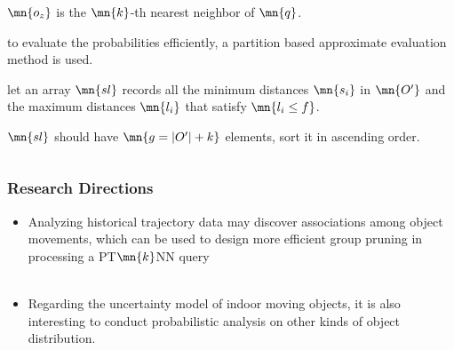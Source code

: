 \begin{frame}
\begin{columns}[c]
  \begin{sitemize}
    \item $\mn{o_z}$ is the $\mn{k}$-th nearest neighbor of $\mn{q}$.
    \item to evaluate the probabilities efficiently, a partition based approximate evaluation method is used.
    \item let an array $\mn{sl}$ records all the minimum distances $\mn{s_i}$ in $\mn{O'}$ and the maximum distances $\mn{l_i}$ that satisfy $\mn{l_i \leq f}$.
    \item $\mn{sl}$ should have $\mn{g = |O'| + k}$ elements, sort it in ascending order.
  \end{sitemize}
\end{columns}

\end{frame}


\begin{frame}
\frametitle{Research Directions}

\begin{itemize}
  \item Analyzing historical trajectory data may discover associations among object movements, which can be used to design more efficient group pruning in processing a PT$\mn{k}$NN query
  \\~\\
  \item Regarding the uncertainty model of indoor moving objects, it is also interesting to conduct probabilistic analysis on other kinds of object distribution.
\end{itemize}

\end{frame}
